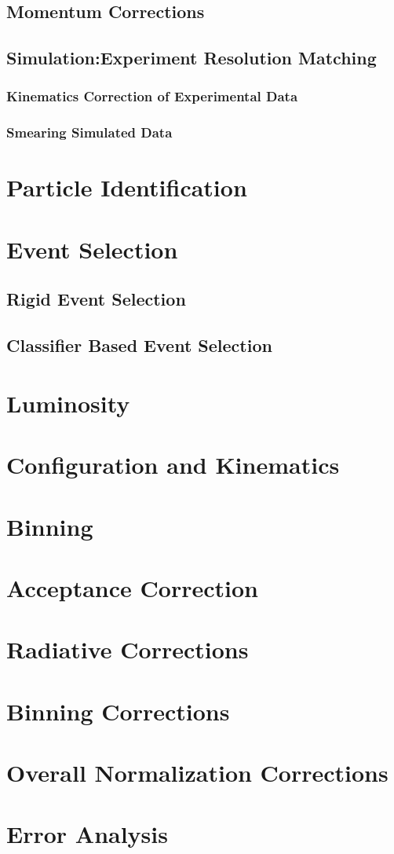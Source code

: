     \subsection{Momentum Corrections}
    \subsection{Simulation:Experiment Resolution Matching}
        \subsubsection{Kinematics Correction of Experimental Data}
        \subsubsection{Smearing Simulated Data}

\section{Particle Identification}

\section{Event Selection}
    \subsection{Rigid Event Selection}
    \subsection{Classifier Based Event Selection}

\section{Luminosity}
    
    
\section{Configuration and Kinematics}

\section{Binning}

\section{Acceptance Correction}

\section{Radiative Corrections}

\section{Binning Corrections}

\section{Overall Normalization Corrections}

\section{Error Analysis}

